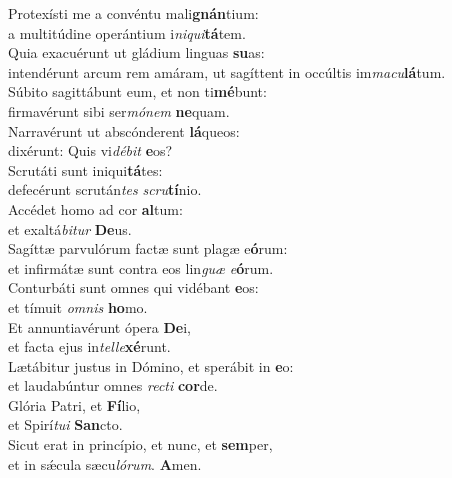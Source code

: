 \evenverse Protexísti me a convéntu mali\textbf{gnán}tium:~\*\\
\evenverse a multitúdine operántium i\textit{ni}\textit{qui}\textbf{tá}tem.\\
\oddverse Quia exacuérunt ut gládium linguas \textbf{su}as:~\*\\
\oddverse intendérunt arcum rem amáram, ut sagíttent in occúltis im\textit{ma}\textit{cu}\textbf{lá}tum.\\
\evenverse Súbito sagittábunt eum, et non ti\textbf{mé}bunt:~\*\\
\evenverse firmavérunt sibi ser\textit{mó}\textit{nem} \textbf{ne}quam.\\
\oddverse Narravérunt ut abscónderent \textbf{lá}queos:~\*\\
\oddverse dixérunt: Quis vi\textit{dé}\textit{bit} \textbf{e}os?\\
\evenverse Scrutáti sunt iniqui\textbf{tá}tes:~\*\\
\evenverse defecérunt scrután\textit{tes} \textit{scru}\textbf{tí}nio.\\
\oddverse Accédet homo ad cor \textbf{al}tum:~\*\\
\oddverse et exaltá\textit{bi}\textit{tur} \textbf{De}us.\\
\evenverse Sagíttæ parvulórum factæ sunt plagæ e\textbf{ó}rum:~\*\\
\evenverse et infirmátæ sunt contra eos lin\textit{guæ} \textit{e}\textbf{ó}rum.\\
\oddverse Conturbáti sunt omnes qui vidébant \textbf{e}os:~\*\\
\oddverse et tímuit \textit{om}\textit{nis} \textbf{ho}mo.\\
\evenverse Et annuntiavérunt ópera \textbf{De}i,~\*\\
\evenverse et facta ejus in\textit{tel}\textit{le}\textbf{xé}runt.\\
\oddverse Lætábitur justus in Dómino, et sperábit in \textbf{e}o:~\*\\
\oddverse et laudabúntur omnes \textit{re}\textit{cti} \textbf{cor}de.\\
\evenverse Glória Patri, et \textbf{Fí}lio,~\*\\
\evenverse et Spirí\textit{tu}\textit{i} \textbf{San}cto.\\
\oddverse Sicut erat in princípio, et nunc, et \textbf{sem}per,~\*\\
\oddverse et in sǽcula sæcu\textit{ló}\textit{rum}. \textbf{A}men.\\
